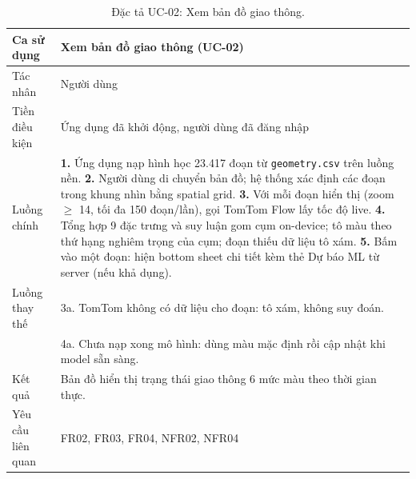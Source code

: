 \begin{table}[h!]
\centering
\caption{Đặc tả UC-02: Xem bản đồ giao thông.}
\label{tab:uc2}
\small
\begin{tabularx}{\textwidth}{lX}
\toprule
\textbf{Ca sử dụng} & Xem bản đồ giao thông (UC-02)\\
\midrule
Tác nhân & Người dùng\\
Tiền điều kiện & Ứng dụng đã khởi động, người dùng đã đăng nhập\\
Luồng chính & \textbf{1.} Ứng dụng nạp hình học 23.417 đoạn từ \texttt{geometry.csv} trên luồng nền. \textbf{2.} Người dùng di chuyển bản đồ; hệ thống xác định các đoạn trong khung nhìn bằng spatial grid. \textbf{3.} Với mỗi đoạn hiển thị (zoom $\ge$ 14, tối đa 150 đoạn/lần), gọi TomTom Flow lấy tốc độ live. \textbf{4.} Tổng hợp 9 đặc trưng và suy luận gom cụm on-device; tô màu theo thứ hạng nghiêm trọng của cụm; đoạn thiếu dữ liệu tô xám. \textbf{5.} Bấm vào một đoạn: hiện bottom sheet chi tiết kèm thẻ Dự báo ML từ server (nếu khả dụng).\\
Luồng thay thế & 3a. TomTom không có dữ liệu cho đoạn: tô xám, không suy đoán.\\
 & 4a. Chưa nạp xong mô hình: dùng màu mặc định rồi cập nhật khi model sẵn sàng.\\
Kết quả & Bản đồ hiển thị trạng thái giao thông 6 mức màu theo thời gian thực.\\
Yêu cầu liên quan & FR02, FR03, FR04, NFR02, NFR04\\
\bottomrule
\end{tabularx}
\end{table}

